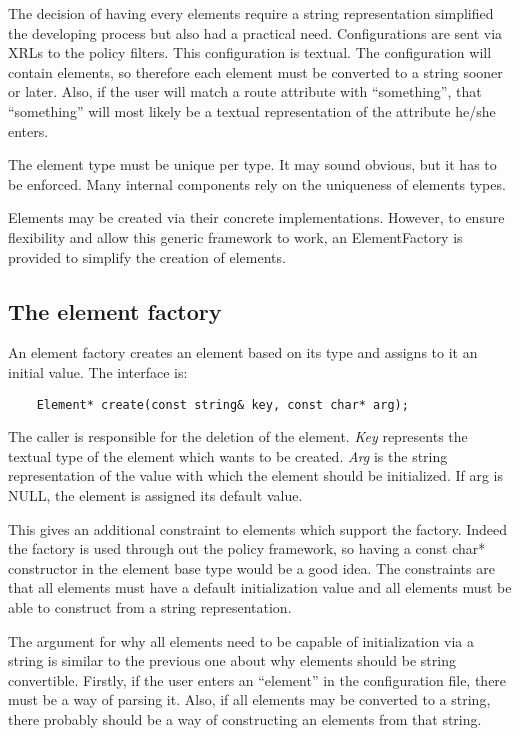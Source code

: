 \documentclass{article}
\begin{document}
The decision of having every elements require a string representation simplified
the developing process but also had a practical need. Configurations are sent
via XRLs to the policy filters. This configuration is textual. The configuration
will contain elements, so therefore each element must be converted to a string
sooner or later. Also, if the user will match a route attribute with
``something'', that ``something'' will most likely be a textual representation
of the attribute he/she enters.

The element type must be unique per type. It may sound obvious, but it has to be
enforced. Many internal components rely on the uniqueness of elements types.

Elements may be created via their concrete implementations. However, to ensure
flexibility and allow this generic framework to work, an ElementFactory is
provided to simplify the creation of elements.

\subsection{The element factory}
An element factory creates an element based on its type and assigns to it an
initial value. The interface is:
\begin{verbatim}
    Element* create(const string& key, const char* arg);
\end{verbatim}
The caller is responsible for the deletion of the element. {\em Key} represents the
textual type of the element which wants to be created. {\em Arg} is the string
representation of the value with which the element should be initialized. If arg
is NULL, the element is assigned its default value.

This gives an additional constraint to elements which support the factory.
Indeed the factory is used through out the policy framework, so having a const
char* constructor in the element base type would be a good idea. The constraints
are that all elements must have a default initialization value and all elements
must be able to construct from a string representation.

The argument for why all elements need to be capable of initialization via
a string is similar to the previous one about why elements should be string
convertible.  Firstly, if the user enters an ``element'' in the configuration
file, there must be a way of parsing it. Also, if all elements may be converted
to a string, there probably should be a way of constructing an elements from
that string.
\end{document}
